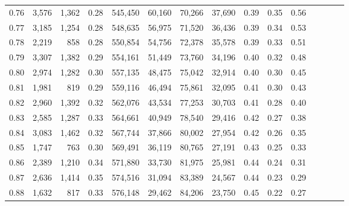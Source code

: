 \begin{tabular}{rrrcrrrrrrrrrrr}
0.76 &   3,576 &   1,362 &                                       0.28 &  545,450 &   60,160 &   70,266 &   37,690 &  0.39 &  0.35 &                         0.56 \\
0.77 &   3,185 &   1,254 &                                       0.28 &  548,635 &   56,975 &   71,520 &   36,436 &  0.39 &  0.34 &                         0.53 \\
0.78 &   2,219 &     858 &                                       0.28 &  550,854 &   54,756 &   72,378 &   35,578 &  0.39 &  0.33 &                         0.51 \\
0.79 &   3,307 &   1,382 &                                       0.29 &  554,161 &   51,449 &   73,760 &   34,196 &  0.40 &  0.32 &                         0.48 \\
0.80 &   2,974 &   1,282 &                                       0.30 &  557,135 &   48,475 &   75,042 &   32,914 &  0.40 &  0.30 &                         0.45 \\
0.81 &   1,981 &     819 &                                       0.29 &  559,116 &   46,494 &   75,861 &   32,095 &  0.41 &  0.30 &                         0.43 \\
0.82 &   2,960 &   1,392 &                                       0.32 &  562,076 &   43,534 &   77,253 &   30,703 &  0.41 &  0.28 &                         0.40 \\
0.83 &   2,585 &   1,287 &                                       0.33 &  564,661 &   40,949 &   78,540 &   29,416 &  0.42 &  0.27 &                         0.38 \\
0.84 &   3,083 &   1,462 &                                       0.32 &  567,744 &   37,866 &   80,002 &   27,954 &  0.42 &  0.26 &                         0.35 \\
0.85 &   1,747 &     763 &                                       0.30 &  569,491 &   36,119 &   80,765 &   27,191 &  0.43 &  0.25 &                         0.33 \\
0.86 &   2,389 &   1,210 &                                       0.34 &  571,880 &   33,730 &   81,975 &   25,981 &  0.44 &  0.24 &                         0.31 \\
0.87 &   2,636 &   1,414 &                                       0.35 &  574,516 &   31,094 &   83,389 &   24,567 &  0.44 &  0.23 &                         0.29 \\
0.88 &   1,632 &     817 &                                       0.33 &  576,148 &   29,462 &   84,206 &   23,750 &  0.45 &  0.22 &                         0.27 \\

\end{tabular}
